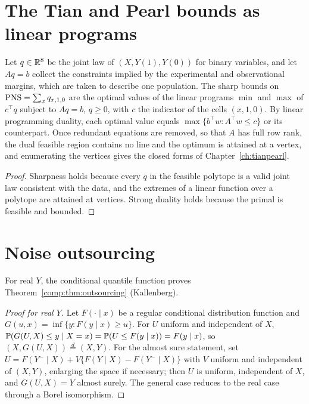 \section{The Tian and Pearl bounds as linear programs}

\begin{proposition}
Let $q \in \mathbb{R}^8$ be the joint law of $(X, Y(1), Y(0))$ for binary variables, and let $Aq = b$ collect the constraints implied by the experimental and observational margins, which are taken to describe one population. The sharp bounds on $\mathrm{PNS} = \sum_x q_{x,1,0}$ are the optimal values of the linear programs $\min$ and $\max$ of $c^\top q$ subject to $Aq = b$, $q \geq 0$, with $c$ the indicator of the cells $(x, 1, 0)$. By linear programming duality, each optimal value equals $\max\{b^\top w : A^\top w \leq c\}$ or its counterpart. Once redundant equations are removed, so that $A$ has full row rank, the dual feasible region contains no line and the optimum is attained at a vertex, and enumerating the vertices gives the closed forms of Chapter~\ref{ch:tianpearl}.
\end{proposition}

\begin{proof}
Sharpness holds because every $q$ in the feasible polytope is a valid joint law consistent with the data, and the extremes of a linear function over a polytope are attained at vertices. Strong duality holds because the primal is feasible and bounded.
\end{proof}

\section{Noise outsourcing}

For real $Y$, the conditional quantile function proves Theorem~\ref{comp:thm:outsourcing} (Kallenberg).

\begin{proof}[Proof for real $Y$]
Let $F(\cdot \mid x)$ be a regular conditional distribution function and $G(u,x) = \inf\{y : F(y \mid x) \geq u\}$. For $U$ uniform and independent of $X$, $\mathbb{P}(G(U,X) \leq y \mid X = x) = \mathbb{P}(U \leq F(y \mid x)) = F(y \mid x)$, so $(X, G(U,X)) \overset{d}{=} (X, Y)$. For the almost sure statement, set $U = F(Y^- \mid X) + V\{F(Y \mid X) - F(Y^- \mid X)\}$ with $V$ uniform and independent of $(X, Y)$, enlarging the space if necessary; then $U$ is uniform, independent of $X$, and $G(U,X) = Y$ almost surely. The general case reduces to the real case through a Borel isomorphism.
\end{proof}


